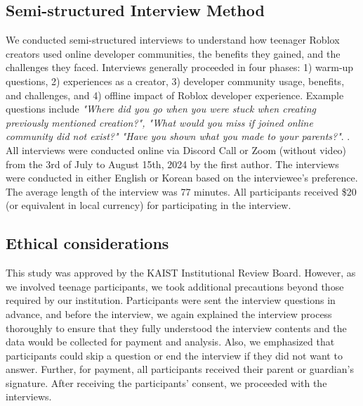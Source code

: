 \subsection{Semi-structured Interview Method}
We conducted semi-structured interviews to understand how teenager Roblox creators used online developer communities, the benefits they gained, and the challenges they faced. Interviews generally proceeded in four phases: 1) warm-up questions, 2) experiences as a creator, 3) developer community usage, benefits, and challenges, and 4) offline impact of Roblox developer experience. Example questions include \textit{"Where did you go when you were stuck when creating {previously mentioned creation}?", "What would you miss if {joined online community} did not exist?" "Have you shown what you made to your parents?"}. . All interviews were conducted online via Discord Call or Zoom (without video) from the 3rd of July to August 15th, 2024 by the first author. The interviews were conducted in either English or Korean based on the interviewee's preference. The average length of the interview was 77 minutes. All participants received \$20 (or equivalent in local currency) for participating in the interview. 


%



\subsection{Ethical considerations}
This study was approved by the KAIST Institutional Review Board. However, as we involved teenage participants, we took additional precautions beyond those required by our institution. Participants were sent the interview questions in advance, and before the interview, we again explained the interview process thoroughly to ensure that they fully understood the interview contents and  the data would be collected for payment and analysis. Also, we emphasized that participants could skip a question or end the interview if they did not want to answer. Further, for payment, all participants received their parent or guardian's signature. After receiving the participants' consent, we proceeded with the interviews.

